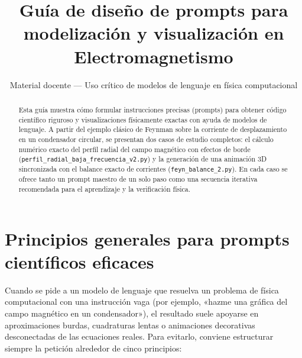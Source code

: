 \documentclass[11pt]{article}
\title{\textbf{\color{accentblue}Guía de diseño de prompts para modelización y visualización en Electromagnetismo}}
\author{Material docente --- Uso crítico de modelos de lenguaje en física computacional}
\date{}
\begin{document}
\maketitle

\begin{abstract}
Esta guía muestra cómo formular instrucciones precisas (prompts) para obtener código científico riguroso y visualizaciones físicamente exactas con ayuda de modelos de lenguaje. A partir del ejemplo clásico de Feynman sobre la corriente de desplazamiento en un condensador circular, se presentan dos casos de estudio completos: el cálculo numérico exacto del perfil radial del campo magnético con efectos de borde (\texttt{perfil\_radial\_baja\_frecuencia\_v2.py}) y la generación de una animación 3D sincronizada con el balance exacto de corrientes (\texttt{feyn\_balance\_2.py}). En cada caso se ofrece tanto un prompt maestro de un solo paso como una secuencia iterativa recomendada para el aprendizaje y la verificación física.
\end{abstract}

\tableofcontents
\vspace{0.4cm}

\section{Principios generales para prompts científicos eficaces}

Cuando se pide a un modelo de lenguaje que resuelva un problema de física computacional con una instrucción vaga (por ejemplo, «hazme una gráfica del campo magnético en un condensador»), el resultado suele apoyarse en aproximaciones burdas, cuadraturas lentas o animaciones decorativas desconectadas de las ecuaciones reales. Para evitarlo, conviene estructurar siempre la petición alrededor de cinco principios:
\end{document}

